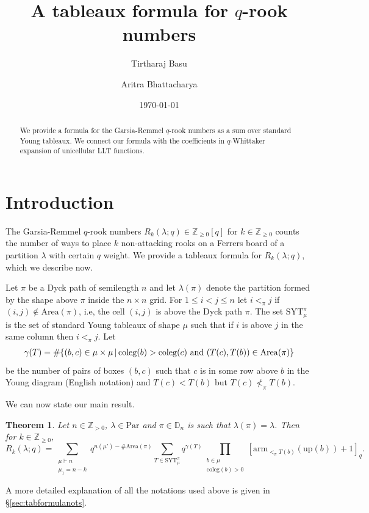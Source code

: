 \documentclass[12pt,reqno]{amsart}
\title[$q$-rook numbers]{A tableaux formula for $q$-rook numbers}
\author[Basu]{Tirtharaj Basu}
\author[Bhattacharya]{Aritra Bhattacharya}
\date{\today}
\theoremstyle{plain}
\newtheorem{theorem}{Theorem}[section]
\theoremstyle{definition}
\theoremstyle{remark}
\theoremstyle{example}
\numberwithin{equation}{section}
\newcommand\ZZ{\mathbb{Z}}
\newcommand\Par{\mathrm{Par}}
\newcommand\up{\mathrm{up}}
\newcommand\arm{\mathrm{arm}}
\newcommand{\coleg}{\mathrm{coleg}}
\newcommand{\SYT}{\mathrm{SYT}}
\newcommand{\Area}{\mathrm{Area}}
\newcommand{\DD}{\mathbb{D}}
\begin{document}
	
	\maketitle

\begin{abstract}
	We provide a formula for the Garsia-Remmel $q$-rook numbers as a sum over standard Young tableaux. We connect our formula with the coefficients in $q$-Whittaker expansion of unicellular LLT functions. 
\end{abstract}

\section{Introduction}

The Garsia-Remmel $q$-rook numbers $R_k(\lambda;q) \in \ZZ_{\geq 0}[q]$ for $k \in \ZZ_{\geq 0}$ counts the number of ways to place $k$ non-attacking rooks on a Ferrers board of a partition $\lambda$ with certain $q$ weight. We provide a tableaux formula for $R_k(\lambda;q)$, which we describe now.

Let $\pi$ be a Dyck path of semilength $n$ and let $\lambda(\pi)$ denote the partition formed by the shape above $\pi$ inside the $n \times n$ grid. For $1\leq i<j \leq n$ let $i<_\pi j$ if $(i,j) \notin \Area(\pi)$, i.e, the cell $(i,j)$ is above the Dyck path $\pi$. The set $\SYT^\pi_\mu$ is the set of standard Young tableaux of shape $\mu$ such that if  $i$ is above $j$ in the same column then $i <_\pi j$. Let \begin{align*}
	\gamma(T) = \# \{(b,c) \in \mu\times \mu\,|\, \coleg(b)>\coleg(c) \hbox{ and } (T(c),T(b)) \in \Area(\pi) \}
\end{align*} be the number of pairs of boxes $(b,c)$ such that $c$ is in some row above $b$ in the Young diagram (English notation) and $T(c) < T(b)$ but $T(c) \nless_\pi T(b)$. 

We can now state our main result. 
 \begin{theorem}\label{th:mainthmintrostate}
	Let $n \in \ZZ_{>0}$, $\lambda \in \Par$ and $\pi \in \DD_n$ is such that $\lambda(\pi) = \lambda$. Then for $k \in \ZZ_{\geq 0},$ \begin{equation}\label{eq:mainthmeq}
		R_k(\lambda;q) = \sum_{\substack{\mu \vdash n \\ \mu_1 = n-k}} q^{n(\mu')-\# \Area(\pi)} \sum_{T \in \SYT^\pi_\mu}
		q^{\gamma(T)} \prod_{\substack{b \in \mu \\ \coleg(b)>0}} [\arm_{<_\pi T(b)}(\up(b))+1]_q.
	\end{equation} 
\end{theorem}
A more detailed explanation of all the notations used above is given in  \S\ref{sec:tabformulanots}.
 
\end{document}
